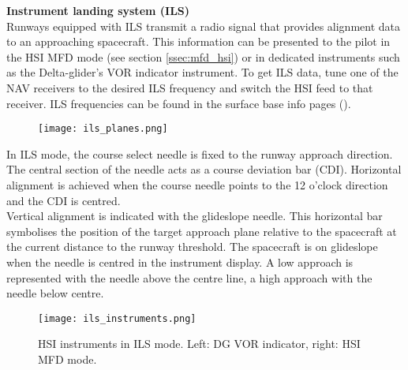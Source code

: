 \documentclass[Orbiter User Manual.tex]{subfiles}
\begin{document}
\noindent
\textbf{Instrument landing system (ILS)}\\
Runways equipped with ILS transmit a radio signal that provides alignment data to an approaching spacecraft. This information can be presented to the pilot in the HSI MFD mode (see section \ref{ssec:mfd_hsi}) or in dedicated instruments such as the Delta-glider's VOR indicator instrument. To get ILS data, tune one of the NAV receivers to the desired ILS frequency and switch the HSI feed to that receiver. ILS frequencies can be found in the surface base info pages (\Ctrl{}).

\begin{figure}[H]
	\centering
	\texttt{[image: ils\_planes.png]}
\end{figure}

\noindent
In ILS mode, the course select needle is fixed to the runway approach direction. The central section of the needle acts as a course deviation bar (CDI). Horizontal alignment is achieved when the course needle points to the 12 o'clock direction and the CDI is centred.\\
Vertical alignment is indicated with the glideslope needle. This horizontal bar symbolises the position of the target approach plane relative to the spacecraft at the current distance to the runway threshold. The spacecraft is on glideslope when the needle is centred in the instrument display. A low approach is represented with the needle above the centre line, a high approach with the needle below centre.

\begin{figure}[H]
	\centering
	\texttt{[image: ils\_instruments.png]}
	\caption{HSI instruments in ILS mode. Left: DG VOR indicator, right: HSI MFD mode.}
\end{figure}
\end{document}
